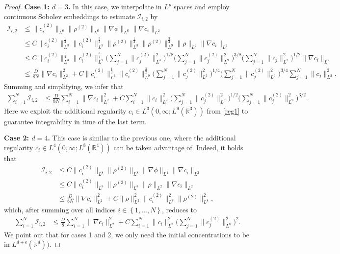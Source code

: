 \documentclass[11pt,reqno]{amsart}
\newcommand{\be}{\begin{equation}}
\newcommand{\ee}{\end{equation}}
\newcommand{\R}{\mathbb R}
\begin{document}
\begin{proof}
\textbf{Case 1: $d=3$.} In this case, we interpolate in $L^p$ spaces and employ continuous Sobolev embeddings to estimate $\mathcal{I}_{i,2}$ by 
\be 
\begin{aligned}
\mathcal{I}_{i,2} &\le \|c_i^{(2)}\|_{L^{6}} \|\rho^{(2)}\|_{L^{6}} \|\nabla\phi\|_{L^6} \|\nabla c_i\|_{L^2}
\\&\le C \|c_i^{(2)}\|_{L^{3}}^\frac{1}{4} \|c_i^{(2)}\|_{L^{9}}^\frac{3}{4} \|\rho^{(2)}\|_{L^{3}}^\frac{1}{4} \|\rho^{(2)}\|_{L^{9}}^\frac{3}{4} \|\rho\|_{L^{2}} \|\nabla c_i\|_{L^2}  \\
&\le C \|c_i^{(2)}\|_{L^{3}}^\frac{1}{4} \|c_i^{(2)}\|_{L^{9}}^\frac{3}{4} \bigg(\sum_{j=1}^N
\|c_j^{(2)}\|_{L^3}^2\bigg)^{1/8} \bigg(\sum_{j=1}^N
\|c_j^{(2)}\|_{L^9}^2\bigg)^{3/8} \bigg(\sum_{j=1}^N
\|c_j\|_{L^2}^2\bigg)^{1/2} \|\nabla c_i\|_{L^2} \\
&\le \frac{D}{8N} \|\nabla c_i\|_{L^2}^2 + C \|c_i^{(2)}\|_{L^{3}}^\frac{1}{2} \|c_i^{(2)}\|_{L^{9}}^\frac{3}{2} \bigg(\sum_{j=1}^N \|c_j^{(2)}\|_{L^3}^2\bigg)^{1/4} \bigg(\sum_{j=1}^N \|c_j^{(2)}\|_{L^9}^2\bigg)^{3/4} \sum_{j=1}^N \|c_j\|_{L^2}^2.
\end{aligned}
\ee 
Summing and simplifying, we infer that 
\be
\begin{aligned}\label{t1case1}
\sum\limits_{i=1}^{N}  \mathcal{I}_{i,2} &\le \frac{D}{8N} \sum_{i=1}^N \|\nabla c_i\|_{L^2}^2 + C \sum_{i=1}^N \|c_i\|_{L^2}^2 \bigg(\sum_{j=1}^N \|c_j^{(2)}\|_{L^3}^2\bigg)^{1/2} \bigg(\sum_{j=1}^N \|c_j^{(2)}\|_{L^9}^2\bigg)^{3/2}.
\end{aligned}
\ee Here we exploit the additional regularity $c_i \in L^3(0, \infty; L^9(\R^3))$ from \eqref{reg1} to guarantee integrability in time of the last term. 


\textbf{Case 2: $d=4$. } This case is similar to the previous one, where the additional regularity $c_i \in L^4(0, \infty; L^8(\R^4))$ can be taken advantage of. Indeed, it holds that 
\be 
\begin{aligned}
\mathcal{I}_{i,2} &\le C\|c_i^{(2)}\|_{L^{8}} \|\rho^{(2)}\|_{L^{8}} \|\nabla\phi\|_{L^4} \|\nabla c_i\|_{L^2}
\\&\le C\|c_i^{(2)}\|_{L^{8}} \|\rho^{(2)}\|_{L^{8}} \|\rho\|_{L^2} \|\nabla c_i\|_{L^2} \nonumber \\
&\le \frac{D}{8N} \|\nabla c_i\|_{L^2}^2 + C \|\rho\|_{L^2}^2 \|c_i^{(2)}\|_{L^{8}}^2 \|\rho^{(2)}\|_{L^{8}}^2,
\end{aligned}
\ee which, after summing over all indices $i \in \left\{1, \dots, N \right\}$, reduces to 
\begin{align}\label{t1case2}
\sum\limits_{i=1}^{N} \mathcal{I}_{i,2} &\le \frac D8 \sum_{i=1}^N \|\nabla c_i\|_{L^2}^2 + C \sum_{i=1}^N \|c_i\|_{L^2}^2 \bigg(\sum_{j=1}^N \|c_j^{(2)}\|_{L^{8}}^2\bigg)^2.
\end{align}
We point out that for cases 1 and 2, we only need the initial concentrations to be in  $L^{d+\epsilon} (\mathbb{R}^d)).$


\end{proof}
\end{document}
